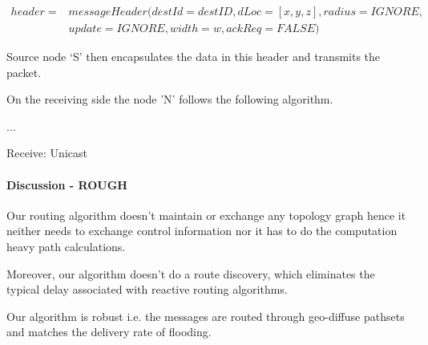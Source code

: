 \begin{eqnarray*}
header = & messageHeader(destId = destID, dLoc = [x,y,z], radius = IGNORE,\\
    & update = IGNORE, width = w, ackReq = FALSE)
\end{eqnarray*}

Source node `S' then encapsulates the data in this header and transmits the packet.

On the receiving side the node 'N' follows the following algorithm.

\begin{algorithm}
\SetAlgoLined
{...\;}
\caption{Receive: Unicast} \label{unicast_recv}
\end{algorithm}

\paragraph{Discussion - ROUGH}

Our routing algorithm doesn't maintain or exchange any topology graph hence it neither needs to exchange control information nor it has to do the computation heavy path calculations.

Moreover, our algorithm doesn't do a route discovery, which eliminates the typical delay associated with reactive routing algorithms. 

Our algorithm is robust i.e. the messages are routed through geo-diffuse pathsets and matches the delivery rate of flooding.